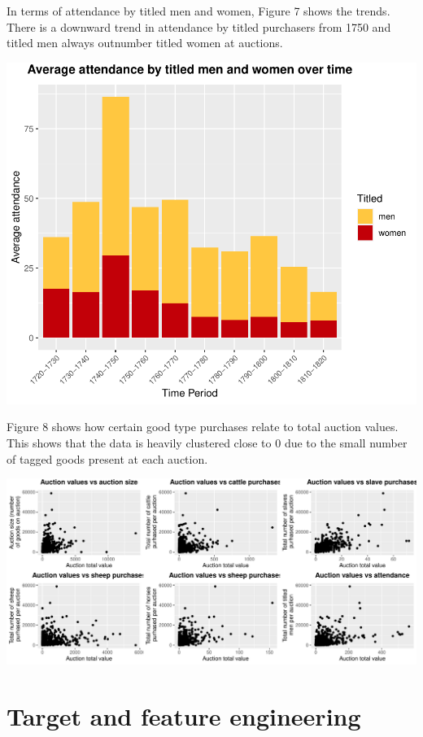 \documentclass[11pt,preprint, authoryear]{elsarticle}
\numberwithin{equation}{section}
\numberwithin{figure}{section}
\numberwithin{table}{section}
\begin{document}
In terms of attendance by titled men and women, Figure 7 shows the
trends. There is a downward trend in attendance by titled purchasers
from 1750 and titled men always outnumber titled women at auctions.

\includegraphics{Project_write_up_files/figure-latex/Figure7-1.pdf}

Figure 8 shows how certain good type purchases relate to total auction
values. This shows that the data is heavily clustered close to 0 due to
the small number of tagged goods present at each auction.

\includegraphics{Project_write_up_files/figure-latex/Figure8-1.pdf}

\hypertarget{target-and-feature-engineering}{%
\section*{Target and feature
engineering}\label{target-and-feature-engineering}}
\end{document}
